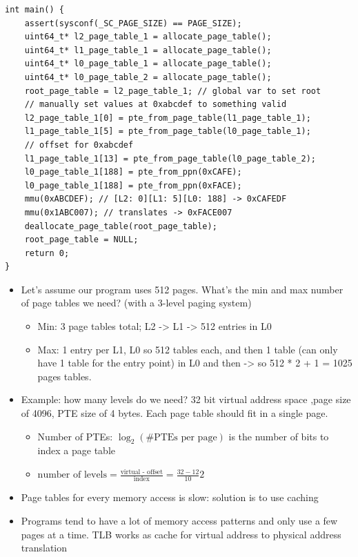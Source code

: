 \documentclass[../notes.tex]{subfiles}
\begin{document}
\begin{listing}[H]
\begin{verbatim}
int main() {
    assert(sysconf(_SC_PAGE_SIZE) == PAGE_SIZE);
    uint64_t* l2_page_table_1 = allocate_page_table();
    uint64_t* l1_page_table_1 = allocate_page_table();
    uint64_t* l0_page_table_1 = allocate_page_table();
    uint64_t* l0_page_table_2 = allocate_page_table();
    root_page_table = l2_page_table_1; // global var to set root
    // manually set values at 0xabcdef to something valid
    l2_page_table_1[0] = pte_from_page_table(l1_page_table_1);
    l1_page_table_1[5] = pte_from_page_table(l0_page_table_1);
    // offset for 0xabcdef
    l1_page_table_1[13] = pte_from_page_table(l0_page_table_2);
    l0_page_table_1[188] = pte_from_ppn(0xCAFE);
    l0_page_table_1[188] = pte_from_ppn(0xFACE);
    mmu(0xABCDEF); // [L2: 0][L1: 5][L0: 188] -> 0xCAFEDF
    mmu(0x1ABC007); // translates -> 0xFACE007
    deallocate_page_table(root_page_table);
    root_page_table = NULL;
    return 0;
}
\end{verbatim}
\end{listing}

\begin{itemize}
    \item Let's assume our program uses 512 pages. What's the min and max number of page tables we need? (with a 3-level paging system)
        \begin{itemize}
            \item Min: 3 page tables total; L2 -> L1 -> 512 entries in L0
            \item Max: 1 entry per L1, L0 so 512 tables each, and then 1 table (can only have 1 table for the entry point) in L0 and then -> so 512 * 2 + 1 = 1025 pages tables.
        \end{itemize}
    \item Example: how many levels do we need? 32 bit virtual address space ,page size of 4096, PTE size of 4 bytes. Each page table should fit in a single page. 
        \begin{itemize}
            \item Number of PTEs: $ \log_2(\text{\# PTEs per page}) $ is the number of bits to index a page table
            \item $ \text{number of levels} = \frac{\text{virtual - offset}}{\text{index}} = \frac{32-12}{10} 2$ 
        \end{itemize}
    \item Page tables for every memory access is slow: solution is to use caching
    \item Programs tend to have a lot of memory access patterns and only use a few pages at a time. TLB works as cache for virtual address to physical address translation

\end{itemize}
\end{document}
